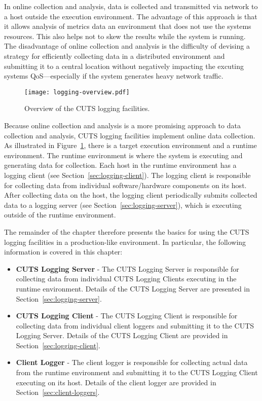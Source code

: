 In online collection and analysis, data is collected and transmitted 
via network to a host outside the execution environment. The advantage 
of this approach is that it allows analysis of metrics data an environment 
that does not use the systems resources. This also helps not to skew the 
results while the system is running. The disadvantage of online collection
and analysis is the difficulty of devising a strategy for efficiently collecting 
data in a distributed environment and submitting it to a central location 
without negatively impacting the excuting systems QoS---especially if the
system generates heavy network traffic.
\begin{figure}[htbp]
  \centering
  \texttt{[image: logging-overview.pdf]}
  \caption{Overview of the CUTS logging facilities.}
  \label{fig:logging-overview}
\end{figure}

Because online collection and analysis is a more promising approach to 
data collection and analysis, CUTS logging facilities implement online
data collection. As illustrated in Figure~\ref{fig:logging-overview},
there is a target execution environment and a runtime environment. The
runtime environment is where the system is executing and generating
data for collection. Each host in the runtime environment has a logging
client (see Section~\ref{sec:logging-client}). The logging client is 
responsible for collecting data from individual software/hardware components 
on its host. After collecting data on the host, the logging client 
periodically submits collected data to a logging server (see 
Section~\ref{sec:logging-server}), which is executing outside of 
the runtime environment.

The remainder of the chapter therefore presents the basics for
using the CUTS logging facilities in a production-like environment.
In particular, the following information is covered in this 
chapter:
\begin{itemize}
  \item \textbf{CUTS Logging Server} - The CUTS Logging Server is
  responsible for collecting data from individual CUTS Logging 
  Clients executing in the runtime environment. Details of the
  CUTS Logging Server are presented in Section~\ref{sec:logging-server}.

  \item \textbf{CUTS Logging Client} - The CUTS Logging Client is
  responsible for collecting data from individual client loggers and
  submitting it to the CUTS Logging Server. Details of the
  CUTS Logging Client are provided in Section~\ref{sec:logging-client}.

  \item \textbf{Client Logger} - The client logger is responsible for 
  collecting actual data from the runtime environment and submitting 
  it to the CUTS Logging Client executing on its host. Details of 
  the client logger are provided in Section~\ref{sec:client-loggers}.
\end{itemize}


